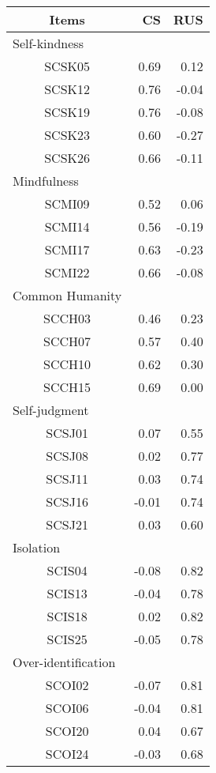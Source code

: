 \captionsetup[table]{labelformat=empty,skip=1pt}
\begin{longtable}{crr}
\toprule
Items & CS & RUS \\ 
\midrule
\multicolumn{1}{l}{Self-kindness} \\ 
\midrule
SCSK05 & 0.69 & 0.12 \\ 
SCSK12 & 0.76 & -0.04 \\ 
SCSK19 & 0.76 & -0.08 \\ 
SCSK23 & 0.60 & -0.27 \\ 
SCSK26 & 0.66 & -0.11 \\ 
\midrule
\multicolumn{1}{l}{Mindfulness} \\ 
\midrule
SCMI09 & 0.52 & 0.06 \\ 
SCMI14 & 0.56 & -0.19 \\ 
SCMI17 & 0.63 & -0.23 \\ 
SCMI22 & 0.66 & -0.08 \\ 
\midrule
\multicolumn{1}{l}{Common Humanity} \\ 
\midrule
SCCH03 & 0.46 & 0.23 \\ 
SCCH07 & 0.57 & 0.40 \\ 
SCCH10 & 0.62 & 0.30 \\ 
SCCH15 & 0.69 & 0.00 \\ 
\midrule
\multicolumn{1}{l}{Self-judgment} \\ 
\midrule
SCSJ01 & 0.07 & 0.55 \\ 
SCSJ08 & 0.02 & 0.77 \\ 
SCSJ11 & 0.03 & 0.74 \\ 
SCSJ16 & -0.01 & 0.74 \\ 
SCSJ21 & 0.03 & 0.60 \\ 
\midrule
\multicolumn{1}{l}{Isolation} \\ 
\midrule
SCIS04 & -0.08 & 0.82 \\ 
SCIS13 & -0.04 & 0.78 \\ 
SCIS18 & 0.02 & 0.82 \\ 
SCIS25 & -0.05 & 0.78 \\ 
\midrule
\multicolumn{1}{l}{Over-identification} \\ 
\midrule
SCOI02 & -0.07 & 0.81 \\ 
SCOI06 & -0.04 & 0.81 \\ 
SCOI20 & 0.04 & 0.67 \\ 
SCOI24 & -0.03 & 0.68 \\ 
\bottomrule
\end{longtable}

